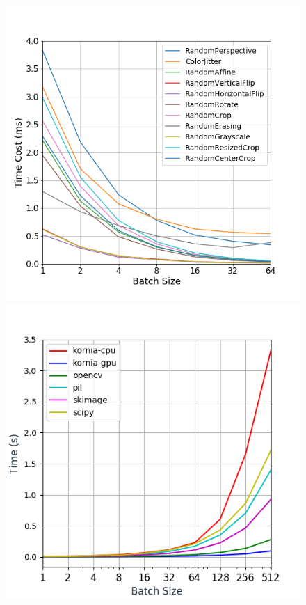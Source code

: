 \begin{figure}
\centering
 \begin{minipage}{.5\textwidth}
    \includegraphics[scale=0.3]{main/chapter03/data/op_benchmark.png}
 \end{minipage}%
\begin{minipage}{.5\textwidth}
    \centering
    \includegraphics[scale=0.46]{main/chapter03/data/benchmark.png}

\end{minipage}
\end{figure}
